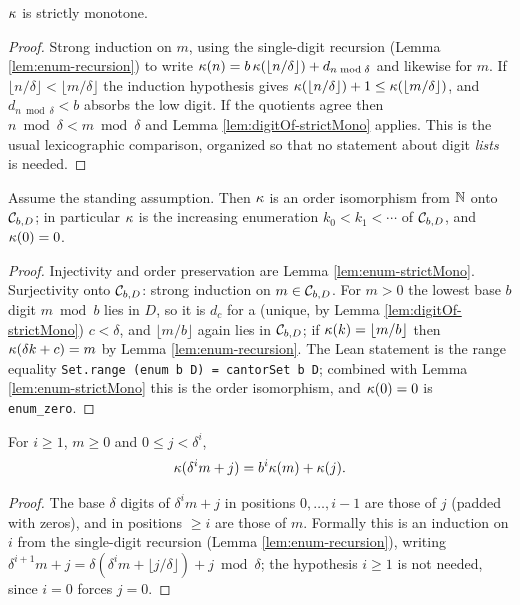 \begin{lemma}
  \label{lem:enum-strictMono}
  \leanok
  $\kappa$ is strictly monotone.
\end{lemma}
\begin{proof}
  \leanok
  Strong induction on $m$, using the single-digit recursion
  (Lemma \ref{lem:enum-recursion}) to write
  $\kappa(n) = b\,\kappa(\lfloor n/\delta \rfloor) + d_{n \bmod \delta}$
  and likewise for $m$. If $\lfloor n/\delta \rfloor <
  \lfloor m/\delta \rfloor$ the induction hypothesis gives
  $\kappa(\lfloor n/\delta \rfloor) + 1 \leq
  \kappa(\lfloor m/\delta \rfloor)$, and $d_{n \bmod \delta} < b$ absorbs
  the low digit. If the quotients agree then $n \bmod \delta <
  m \bmod \delta$ and Lemma \ref{lem:digitOf-strictMono} applies. This is
  the usual lexicographic comparison, organized so that no statement about
  digit \emph{lists} is needed.
\end{proof}

\begin{theorem}[Proposition 2.5(i)]
  \label{thm:enum-bij}
  \leanok
  Assume the standing assumption. Then $\kappa$ is an order isomorphism from
  $\mathbb{N}$ onto $\mathcal{C}_{b,D}$; in particular $\kappa$ is the increasing enumeration
  $k_0 < k_1 < \cdots$ of $\mathcal{C}_{b,D}$, and $\kappa(0) = 0$.
\end{theorem}
\begin{proof}
  \leanok
  Injectivity and order preservation are Lemma \ref{lem:enum-strictMono}.
  Surjectivity onto $\mathcal{C}_{b,D}$: strong induction on $m \in \mathcal{C}_{b,D}$. For $m > 0$ the
  lowest base $b$ digit $m \bmod b$ lies in $D$, so it is $d_c$ for a (unique,
  by Lemma \ref{lem:digitOf-strictMono}) $c < \delta$, and
  $\lfloor m/b \rfloor$ again lies in $\mathcal{C}_{b,D}$; if
  $\kappa(k) = \lfloor m/b \rfloor$ then $\kappa(\delta k + c) = m$ by
  Lemma \ref{lem:enum-recursion}.  The Lean statement is the range equality
  \texttt{Set.range (enum b D) = cantorSet b D}; combined with
  Lemma \ref{lem:enum-strictMono} this is the order isomorphism, and
  $\kappa(0) = 0$ is \texttt{enum\_zero}.
\end{proof}

\begin{lemma}[Proposition 2.5(ii)]
  \label{lem:enum-block}
  \leanok
  For $i \geq 1$, $m \geq 0$ and $0 \leq j < \delta^i$,
  \[
    \kappa(\delta^i m + j) = b^i \kappa(m) + \kappa(j) .
  \]
\end{lemma}
\begin{proof}
  \leanok
  The base $\delta$ digits of $\delta^i m + j$ in positions $0, \ldots, i-1$
  are those of $j$ (padded with zeros), and in positions $\geq i$ are those of
  $m$.  Formally this is an induction on $i$ from the single-digit recursion
  (Lemma \ref{lem:enum-recursion}), writing
  $\delta^{i+1} m + j = \delta(\delta^i m + \lfloor j/\delta\rfloor) +
  j \bmod \delta$; the hypothesis $i \geq 1$ is not needed, since $i = 0$
  forces $j = 0$.
\end{proof}

